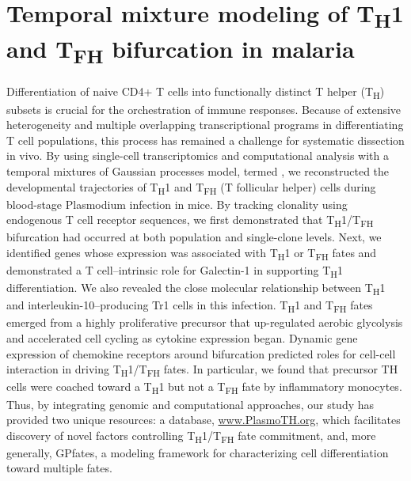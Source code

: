 
\chapter{Temporal mixture modeling of \texorpdfstring{T\textsubscript{H}\textnormal{1} and T\textsubscript{FH}}{TH1 and TFH} bifurcation in malaria} \label{ch:malaria}

\graphicspath{{Chapter4/Figs/}}

Differentiation of na{i}ve CD4+ T cells into functionally distinct T helper (T\textsubscript{H}) subsets is crucial for the orchestration of immune responses. Because of extensive heterogeneity and multiple overlapping transcriptional programs in differentiating T cell populations, this process has remained a challenge for systematic dissection in vivo. By using single-cell transcriptomics and computational analysis with a temporal mixtures of Gaussian processes model, termed , we reconstructed the developmental trajectories of T\textsubscript{H}1 and T\textsubscript{FH} (T follicular helper) cells during blood-stage Plasmodium infection in mice. By tracking clonality using endogenous T cell receptor sequences, we first demonstrated that T\textsubscript{H}1/T\textsubscript{FH} bifurcation had occurred at both population and single-clone levels. Next, we identified genes whose expression was associated with T\textsubscript{H}1 or T\textsubscript{FH} fates and demonstrated a T cell–intrinsic role for Galectin-1 in supporting T\textsubscript{H}1 differentiation. We also revealed the close molecular relationship between T\textsubscript{H}1 and interleukin-10–producing Tr1 cells in this infection. T\textsubscript{H}1 and T\textsubscript{FH} fates emerged from a highly proliferative precursor that up-regulated aerobic glycolysis and accelerated cell cycling as cytokine expression began. Dynamic gene expression of chemokine receptors around bifurcation predicted roles for cell-cell interaction in driving T\textsubscript{H}1/T\textsubscript{FH} fates. In particular, we found that precursor TH cells were coached toward a T\textsubscript{H}1 but not a T\textsubscript{FH} fate by inflammatory monocytes. Thus, by integrating genomic and computational approaches, our study has provided two unique resources: a database, \url{www.PlasmoTH.org}, which facilitates discovery of novel factors controlling T\textsubscript{H}1/T\textsubscript{FH} fate commitment, and, more generally, GPfates, a modeling framework for characterizing cell differentiation toward multiple fates.

